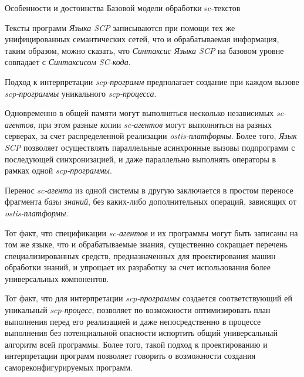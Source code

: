 \begin{frame}{Особенности и достоинства Базовой модели обработки sc-текстов}
\vspace{15}
\begin{textitemize}
    \item Тексты программ \textit{Языка SCP} записываются при помощи тех же унифицированных семантических сетей, что и обрабатываемая информация, таким образом, можно сказать, что \textit{Синтаксис Языка SCP} на базовом уровне совпадает с \textit{Синтаксисом SC-кода}.
    \item Подход к интерпретации \textit{scp-программ} предполагает создание при каждом вызове \textit{scp-программы} уникального \textit{scp-процесса}.
    \item Одновременно в общей памяти могут выполняться несколько независимых \textit{sc-агентов}, при этом разные копии \textit{sc-агентов} могут выполняться на разных серверах, за счет распределенной реализации \textit{ostis-платформы}. Более того, \textit{Язык SCP} позволяет осуществлять параллельные асинхронные вызовы подпрограмм с последующей синхронизацией, и даже параллельно	выполнять операторы в рамках одной \textit{scp-программы}.
    \end{textitemize}
\end{frame}
\begin{textitemize}
    \item Перенос \textit{sc-агента} из одной системы в другую заключается в простом переносе фрагмента \textit{базы знаний}, без каких-либо дополнительных операций, зависящих от \textit{ostis-платформы}.
	\item Тот факт, что спецификации \textit{sc-агентов} и их программы могут быть записаны на том же языке, что и обрабатываемые знания, существенно сокращает перечень специализированных средств, предназначенных для проектирования машин обработки знаний, и упрощает их разработку за счет использования более универсальных компонентов.
	\item Тот факт, что для интерпретации \textit{scp-программы} создается соответствующий ей уникальный \textit{\mbox{scp-процесс}}, позволяет по возможности оптимизировать план выполнения перед его реализацией и даже непосредственно в процессе выполнения без потенциальной опасности испортить общий универсальный алгоритм всей программы. Более того, такой подход к проектированию и интерпретации программ позволяет говорить о возможности создания самореконфигурируемых программ.
\end{textitemize}

